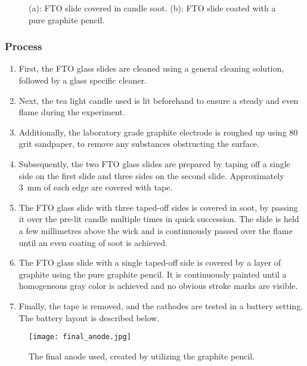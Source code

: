 \begin{figure}[ht!]
\centering
{}
\caption{(a): FTO slide covered in candle soot. (b): FTO slide coated with a pure graphite pencil.}
\label{fig:anodefig}
\end{figure}
    
\subsubsection{Process}

\begin{enumerate}
\item First, the FTO glass slides are cleaned using a general cleaning solution, followed by a glass specific cleaner.
\item Next, the tea light candle used is lit beforehand to ensure a steady and even flame during the experiment.
\item Additionally, the laboratory grade graphite electrode is roughed up using 80 grit sandpaper, to remove any substances obstructing the surface.
\item Subsequently, the two FTO glass slides are prepared by taping off a single side on the first slide and three sides on the second slide. Approximately \SI{3}{\mm} of each edge are covered with tape.
\item The FTO glass slide with three taped-off sides is covered in soot, by passing it over the pre-lit candle multiple times in quick succession. The slide is held a few millimetres above the wick and is continuously passed over the flame until an even coating of soot is achieved.
\item The FTO glass slide with a single taped-off side is covered by a layer of graphite using the pure graphite pencil. It is continuously painted until a homogeneous gray color is achieved and no obvious stroke marks are visible.
\item Finally, the tape is removed, and the cathodes are tested in a battery setting. The battery layout is described below.
\end{enumerate}

\begin{figure}[ht!]
\centering
\texttt{[image: final\_anode.jpg]}
\caption{The final anode used, created by utilizing the graphite pencil.}
\label{fig:finalanode}
\end{figure}

